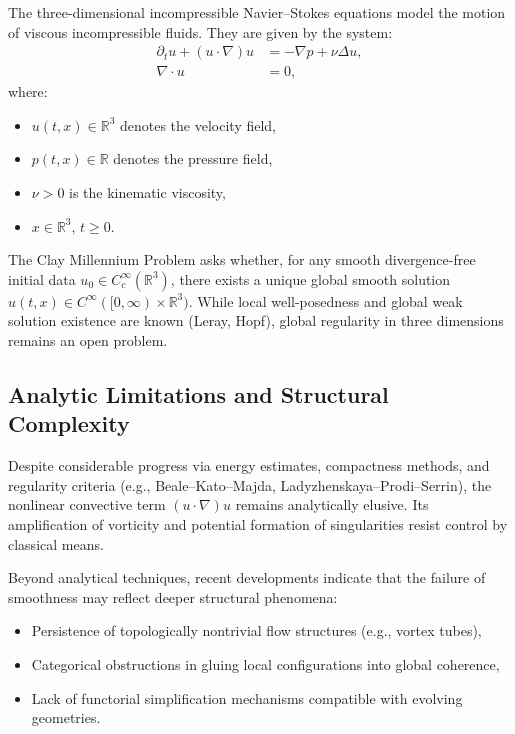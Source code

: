 \documentclass[11pt]{article}
\begin{document}
The three-dimensional incompressible Navier--Stokes equations model the motion of viscous incompressible fluids. They are given by the system:
\begin{equation}
\label{eq:NS}
\begin{aligned}
\partial_t u + (u \cdot \nabla) u &= -\nabla p + \nu \Delta u, \\
\nabla \cdot u &= 0,
\end{aligned}
\end{equation}
where:
\begin{itemize}
  \item \( u(t,x) \in \mathbb{R}^3 \) denotes the velocity field,
  \item \( p(t,x) \in \mathbb{R} \) denotes the pressure field,
  \item \( \nu > 0 \) is the kinematic viscosity,
  \item \( x \in \mathbb{R}^3 \), \( t \geq 0 \).
\end{itemize}

The Clay Millennium Problem asks whether, for any smooth divergence-free initial data \( u_0 \in C_c^\infty(\mathbb{R}^3) \), there exists a unique global smooth solution \( u(t,x) \in C^\infty([0,\infty) \times \mathbb{R}^3) \). While local well-posedness and global weak solution existence are known (Leray, Hopf), global regularity in three dimensions remains an open problem.

\subsection{Analytic Limitations and Structural Complexity}

Despite considerable progress via energy estimates, compactness methods, and regularity criteria (e.g., Beale--Kato--Majda, Ladyzhenskaya--Prodi--Serrin), the nonlinear convective term \( (u \cdot \nabla) u \) remains analytically elusive. Its amplification of vorticity and potential formation of singularities resist control by classical means.

Beyond analytical techniques, recent developments indicate that the failure of smoothness may reflect deeper structural phenomena:
\begin{itemize}
  \item Persistence of topologically nontrivial flow structures (e.g., vortex tubes),
  \item Categorical obstructions in gluing local configurations into global coherence,
  \item Lack of functorial simplification mechanisms compatible with evolving geometries.
\end{itemize}
\end{document}
